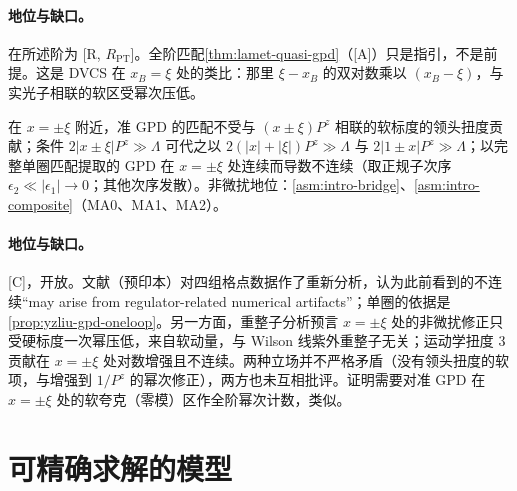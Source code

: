 
\paragraph{地位与缺口。}在所述阶为 [R, $R_{\mathrm{PT}}$]。全阶匹配\cref{thm:lamet-quasi-gpd}（[A]）只是指引，不是前提。这是 DVCS 在 $x_B=\xi$ 处的类比：那里 $\xi-x_B$ 的双对数乘以 $(x_B-\xi)$，与实光子相联的软区受幂次压低\cite{JiOsborne1998,CollinsFreund1999,Radyushkin1997}。

\begin{conjecture}[GPD 在 $x=\pm\xi$ 附近的 LaMET 可计算性 \tagC]\label{conj:yzliu-gpd-xi}
在 $x=\pm\xi$ 附近，准 GPD 的匹配不受与 $(x\pm\xi)P^z$ 相联的软标度的领头扭度贡献；条件 $2|x\pm\xi|P^z\gg\Lambda$ 可代之以 $2(|x|+|\xi|)P^z\gg\Lambda$ 与 $2|1\pm x|P^z\gg\Lambda$；以完整单圈匹配提取的 GPD 在 $x=\pm\xi$ 处连续而导数不连续（取正规子次序 $\epsilon_2\ll|\epsilon_1|\to0$；其他次序发散）\cite{Su:2026eta}。非微扰地位：\cref{asm:intro-bridge}、\cref{asm:intro-composite}（MA0、MA1、MA2）。
\end{conjecture}

\paragraph{地位与缺口。}[C]，开放。文献\cite{Su:2026eta}（预印本）对四组格点数据作了重新分析，认为此前看到的不连续“may arise from regulator-related numerical artifacts”；单圈的依据是\cref{prop:yzliu-gpd-oneloop}。另一方面，重整子分析预言 $x=\pm\xi$ 处的非微扰修正只受硬标度一次幂压低，来自软动量，与 Wilson 线紫外重整子无关\cite{Braun:2024snf}；运动学扭度 3 贡献在 $x=\pm\xi$ 处对数增强且不连续\cite{Braun:2023alc}。两种立场并不严格矛盾（没有领头扭度的软项，与增强到 $1/P^z$ 的幂次修正），两方也未互相批评。证明需要对准 GPD 在 $x=\pm\xi$ 处的软夸克（零模）区作全阶幂次计数，类似\cite{CollinsFreund1999}。

\section{可精确求解的模型}\label{sec:yzliu-models}

